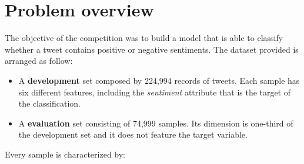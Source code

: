 \documentclass[conference]{IEEEtran}
\begin{document}
\section{Problem overview}\label{sec:overview}
The objective of the competition was to build a model that is able to classify whether a tweet contains positive or negative sentiments. The dataset provided is arranged as follow:
\begin{itemize}
    \item A \textbf{development} set composed by 224,994 records of tweets. Each sample has six different features, including the \textit{sentiment} attribute that is the target of the classification.
    \item A \textbf{evaluation} set consisting of 74,999 samples. Its dimension is one-third of the development set and it does not feature the target variable.
\end{itemize}
Every sample is characterized by:
\end{document}
